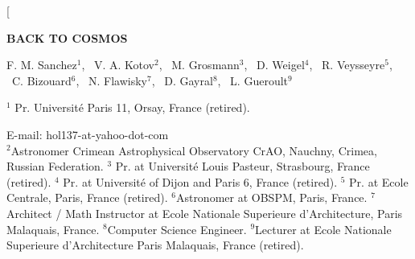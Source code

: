 \documentclass[twoside,draft]{article}
\begin{document}
\begin{sloppypar}

\renewcommand{\refname}{References}
\renewcommand{\tablename}{\small Table}
\renewcommand{\figurename}{\small Fig.}
\renewcommand{\contentsname}{Contents}


\twocolumn[%
\begin{center}
\renewcommand{\baselinestretch}{0.93}
{\Large\bfseries BACK TO COSMOS

}\par
\renewcommand{\baselinestretch}{1.0}
\bigskip
F. M. Sanchez$^1\!$, \ V. A. Kotov$^2\!$, \ M. Grosmann$^3$, \ D. Weigel$^4$, \ R. Veysseyre$^5$, \ C. Bizouard$^6$, \ N. Flawisky$^7$, \ D. Gayral$^8$, \ L. Gueroult$^9$\\
{\footnotesize  $^1$ Pr. Universit\'{e} Paris 11, Orsay, France (retired).\rule{0pt}{12pt}
E-mail: hol137-at-yahoo-dot-com\\
$^2$Astronomer Crimean Astrophysical Observatory CrAO, Nauchny, Crimea, Russian Federation.
$^3$ Pr. at Universit\'{e} Louis Pasteur, Strasbourg, France (retired).
$^4$ Pr. at Universit\'{e} of Dijon and Paris 6, France (retired).
$^5$ Pr. at Ecole Centrale, Paris, France (retired).
$^6$Astronomer at OBSPM, Paris, France.
$^7$Architect / Math Instructor at Ecole Nationale Superieure d'Architecture, Paris Malaquais, France.
$^8$Computer Science Engineer.
$^9$Lecturer at Ecole Nationale Superieure d'Architecture Paris Malaquais, France (retired).

}
\end{center}
\end{sloppypar}
\end{document}
